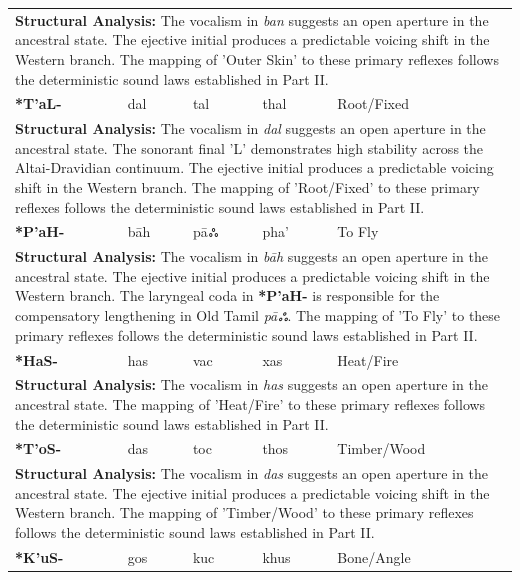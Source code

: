 \begin{longtable}{p{} p{} p{} p{} p{}}
\multicolumn{5}{p{\textwidth}}{\small \textbf{Structural Analysis:} The vocalism in \textit{ban} suggests an open aperture in the ancestral state. The ejective initial produces a predictable voicing shift in the Western branch. The mapping of 'Outer Skin' to these primary reflexes follows the deterministic sound laws established in Part II.} \\ \addlinespace[15pt] 
\textbf{*T'aL-} & dal & tal & thal & Root/Fixed \\ 
\multicolumn{5}{p{\textwidth}}{\small \textbf{Structural Analysis:} The vocalism in \textit{dal} suggests an open aperture in the ancestral state. The sonorant final 'L' demonstrates high stability across the Altai-Dravidian continuum. The ejective initial produces a predictable voicing shift in the Western branch. The mapping of 'Root/Fixed' to these primary reflexes follows the deterministic sound laws established in Part II.} \\ \addlinespace[15pt] 
\textbf{*P'aH-} & bāh & pāஃ & pha' & To Fly \\ 
\multicolumn{5}{p{\textwidth}}{\small \textbf{Structural Analysis:} The vocalism in \textit{bāh} suggests an open aperture in the ancestral state. The ejective initial produces a predictable voicing shift in the Western branch. The laryngeal coda in \textbf{*P'aH-} is responsible for the compensatory lengthening in Old Tamil \textit{pāஃ}. The mapping of 'To Fly' to these primary reflexes follows the deterministic sound laws established in Part II.} \\ \addlinespace[15pt] 
\textbf{*HaS-} & has & vac & xas & Heat/Fire \\ 
\multicolumn{5}{p{\textwidth}}{\small \textbf{Structural Analysis:} The vocalism in \textit{has} suggests an open aperture in the ancestral state. The mapping of 'Heat/Fire' to these primary reflexes follows the deterministic sound laws established in Part II.} \\ \addlinespace[15pt] 
\textbf{*T'oS-} & das & toc & thos & Timber/Wood \\ 
\multicolumn{5}{p{\textwidth}}{\small \textbf{Structural Analysis:} The vocalism in \textit{das} suggests an open aperture in the ancestral state. The ejective initial produces a predictable voicing shift in the Western branch. The mapping of 'Timber/Wood' to these primary reflexes follows the deterministic sound laws established in Part II.} \\ \addlinespace[15pt] 
\textbf{*K'uS-} & gos & kuc & khus & Bone/Angle \\ 

\end{longtable}
